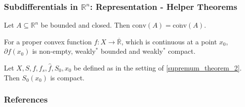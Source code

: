 \documentclass[10pt, hyperref={hidelinks}]{beamer}
\begin{document}
    \begin{frame}
        \frametitle{Subdifferentials in \(\mathbb{R}^n\): Representation - Helper Theorems}

        \pause
        
        \begin{lemma} \label{finite_dim_caratheodory_corollary}
            Let \(A \subseteq \mathbb{R}^n\) be bounded and closed. Then \(\text{conv}(A) = \overline{\text{conv}}(A)\).
        \end{lemma}

        \pause
        
        \begin{lemma} \label{subdifferential_boundedness}
            For a proper convex function \(f\colon X \to \overline{\mathbb{R}}\), which is continuous at a point \(x_0\), \(\partial f(x_0)\) is non-empty, weakly\({}^*\) bounded and weakly\({}^*\) compact.
        \end{lemma}

        \pause
        
        \begin{lemma} \label{s_zero_s_zero_compact_lemma}
            Let \(X, S, f, f_s, \hat{f}, S_0, x_0\) be defined as in the setting of  \ref{supremum_theorem_2}. Then \(S_0(x_0)\) is compact.
        \end{lemma}
    \end{frame}

    \begin{frame}
        \frametitle{References}

        \printbibliography{}
    \end{frame}
\end{document}
